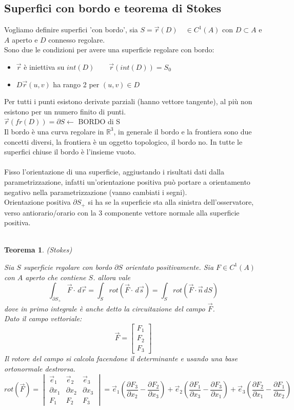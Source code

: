 \documentclass[10pt]{article}
\theoremstyle{plain}
\newtheorem{thm}{Teorema}[section]
\theoremstyle{definition}
\begin{document}
\subsection{Superfici con bordo e teorema di Stokes}
Vogliamo definire superfici 'con bordo', sia $S = \vec{r}(D) \quad \in C^1(A)$ con $D \subset A$ e $A$ aperto e $D$ connesso regolare.\\
Sono due le condizioni per avere una superficie regolare con bordo:
\begin{itemize}
    \item $\vec{r}$ è iniettiva su $int(D) \qquad \vec{r}(int(D))=S_0$
    \item $D\vec{r}(u,v)$ ha rango 2 per $(u,v) \in D$
\end{itemize}
Per tutti i punti esistono derivate parziali (hanno vettore tangente), al più non esistono per un numero finito di punti.\\
$\vec{r}(fr(D)) = \partial S \leftarrow$ BORDO di S\\
Il bordo è una curva regolare in $\mathbb{R}^3$, in generale il bordo e la frontiera sono due concetti diversi, la frontiera è un oggetto topologico, il bordo no. In tutte le superfici chiuse il bordo è l'insieme vuoto.\\ \\
Fisso l'orientazione di una superficie, aggiustando i risultati dati dalla parametrizzazione, infatti un'orientazione positiva può portare a orientamento negativo nella parametrizzazione (vanno cambiati i segni).\\
Orientazione positiva $\partial S_+$ si ha se la superficie sta alla sinistra dell'osservatore, verso antiorario/orario con la 3 componente vettore normale alla superficie positiva.\\
\\
\begin{thm} (Stokes)

Sia $S$ superficie regolare con bordo $\partial S$ orientato positivamente. Sia $F \in C^1(A)$ con $A$ aperto che contiene $S$. allora vale 
$$\int_{\partial S_+} \vec{F} \cdot \,d\vec{r} = \int_S rot(\vec{F} \cdot \,d\vec{s}) =\int_S rot( \vec{F} \cdot \vec{n}\,dS)$$
dove in primo integrale è anche detto \textit{la circuitazione del campo} $\vec{F}$.\\
Dato il campo vettoriale:
$$\vec{F} = \begin{bmatrix} F_1 \\ F_2 \\ F_3 \end{bmatrix}$$
Il rotore del campo si calcola facendone il determinante e usando una base ortonormale destrorsa.
$$rot(\vec{F}) = \begin{vmatrix} \vec{e}_1 & \vec{e}_2 & \vec{e}_3 \\ \partial x_1 & \partial x_2 & \partial x_3 \\ F_1 & F_2 & F_3\end{vmatrix} = \vec{e}_1 \left( \frac{\partial F_3}{\partial x_2} - \frac{\partial F_2}{\partial x_3}\right) + \vec{e}_2 \left( \frac{\partial F_1}{\partial x_3} - \frac{\partial F_3}{\partial x_1}\right) + \vec{e}_3 \left( \frac{\partial F_2}{\partial x_1} - \frac{\partial F_1}{\partial x_2}\right)$$
\end{thm}
\end{document}

